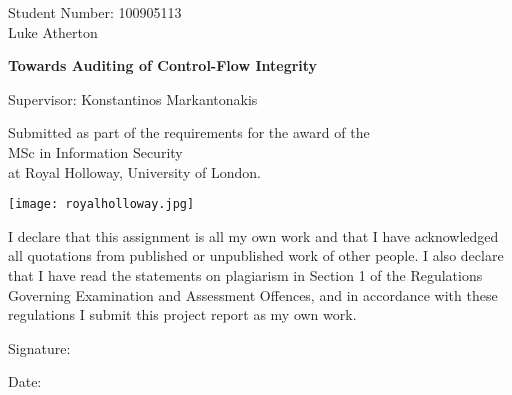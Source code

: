 \begin{titlepage}
    \begin{center}      
		\LARGE
		Student Number: 100905113\\
		Luke Atherton		
		        
        \vspace*{1cm}
        
        \Huge
        \textbf{Towards Auditing of Control-Flow Integrity}
 
        \vspace{0.5cm}
        \LARGE
        Supervisor: Konstantinos Markantonakis
 
        \vspace{1cm}
 
        \vfill
        
 		\large
        Submitted as part of the requirements for the award of the\\
        MSc in Information Security\\
        at Royal Holloway, University of London.
 
        \texttt{[image: royalholloway.jpg]}
        
        \Large
        
        \date{\today}
        
 
    \end{center}
    \normalsize

\noindent
I declare that this assignment is all my own work and that I have acknowledged all quotations from published or unpublished work of other people.  I also declare that I have read the statements on plagiarism in Section 1 of the Regulations Governing Examination and Assessment Offences, and in accordance with these regulations I submit this project report as my own work.

\noindent
Signature:
			
\noindent
Date:
\end{titlepage}
